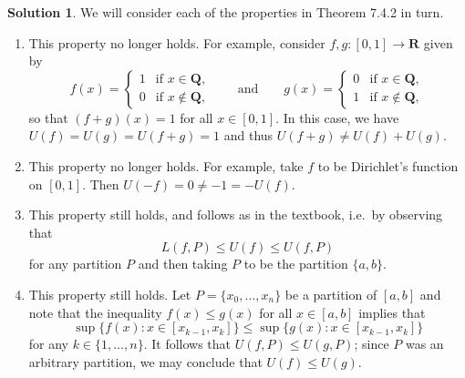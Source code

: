 \documentclass[12pt]{article}
\theoremstyle{definition}
\theoremstyle{exercise}
\theoremstyle{solution}
\newtheorem*{solution}{Solution}
\newcommand{\Q}{\mathbf{Q}}
\newcommand{\R}{\mathbf{R}}
\begin{document}
\begin{solution}
    We will consider each of the properties in Theorem 7.4.2 in turn.
    \begin{enumerate}[label=(\roman*)]
        \item This property no longer holds. For example, consider \( f, g : [0, 1] \to \R \) given by
        \[
            f(x) = \begin{cases}
                1 & \text{if } x \in \Q, \\
                0 & \text{if } x \not\in \Q,
            \end{cases}
            \qquad \text{and} \qquad
            g(x) = \begin{cases}
                0 & \text{if } x \in \Q, \\
                1 & \text{if } x \not\in \Q,
            \end{cases}
        \]
        so that \( (f + g)(x) = 1 \) for all \( x \in [0, 1] \). In this case, we have \( U(f) = U(g) = U(f + g) = 1 \) and thus \( U(f + g) \neq U(f) + U(g) \).

        \item This property no longer holds. For example, take \( f \) to be Dirichlet's function on \( [0, 1] \). Then \( U(-f) = 0 \neq -1 = -U(f) \).

        \item This property still holds, and follows as in the textbook, i.e.\ by observing that
        \[
            L(f, P) \leq U(f) \leq U(f, P)
        \]
        for any partition \( P \) and then taking \( P \) to be the partition \( \{ a, b \} \).

        \item This property still holds. Let \( P = \{ x_0, \ldots, x_n \} \) be a partition of \( [a, b] \) and note that the inequality \( f(x) \leq g(x) \) for all \( x \in [a, b] \) implies that
        \[
            \sup \{ f(x) : x \in [x_{k-1}, x_k] \} \leq \sup \{ g(x) : x \in [x_{k-1}, x_k] \}
        \]
        for any \( k \in \{ 1, \ldots, n \} \). It follows that \( U(f, P) \leq U(g, P) \); since \( P \) was an arbitrary partition, we may conclude that \( U(f) \leq U(g) \).


\end{enumerate}
\end{solution}
\end{document}

